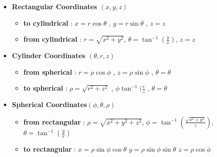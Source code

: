 \documentclass[8pt, twocolumn]{article}
\begin{document}
\begin{itemize}
	\item \textbf{Rectangular Coordinates $(x, y, z)$}
		\begin{itemize}
			\item \textbf{to cylindrical} : $x = r\cos{\theta}$ , $y = r\sin{\theta}$ , $z = z$
			\item \textbf{from cylindrical} : $r = \sqrt{x^2 + y^2}$, $\theta = \tan^{-1}({\frac{y}{x}})$, $z = z$
			
		\end{itemize}
	\item \textbf{Cylinder Coordinates $(\theta, r, z)$}
		\begin{itemize}
			\item \textbf{from spherical} : $r = \rho\cos{\phi}$ , $z = \rho\sin{\phi}$ , $\theta = \theta$
			\item \textbf{to spherical} : $\rho = \sqrt{r^2 + z^2}$ , $\phi \tan^{-1}({\frac{r}{z}}$ , $\theta = \theta$
		\end{itemize}

	\item \textbf{Spherical Coordinates$(\phi, \theta, \rho)$}
		\begin{itemize}
			\item \textbf{from rectangular} : $\rho = \sqrt{x^2 + y^2 + z^2}$, $\phi = \tan^{-1}({\frac{\sqrt{x^2 + y^2}}{z}})$, $\theta = \tan^{-1}({\frac{y}{x}})$
			\item \textbf{to rectangular} : $x = \rho\sin{\phi}\cos{\theta}$ $y = \rho\sin{\phi}\sin{\theta}$ $z = \rho\cos{\phi}$
		\end{itemize}

\end{itemize} 
\end{document}
